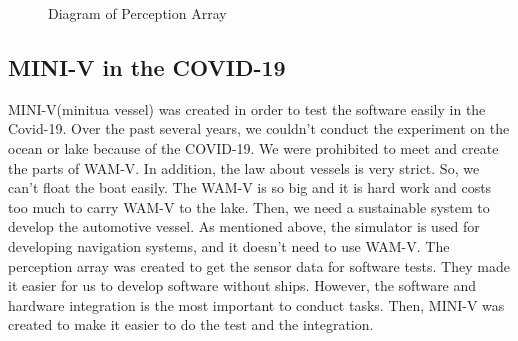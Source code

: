 \documentclass[lettersize,journal]{IEEEtran}
\begin{document}
\begin{figure}[H]
  \begin{center}
  \end{center}
  \caption{Diagram of Perception Array}
  \label{fig:perception_aray_diagram}
\end{figure}


\subsection{MINI-V in the COVID-19}
MINI-V(minitua vessel) was created in order to test the software easily in the Covid-19. Over the past several years, 
we couldn't conduct the experiment on the ocean or lake because of the COVID-19.
We were prohibited to meet and create the parts of WAM-V.
In addition, the law about vessels is very strict.
So, we can't float the boat easily. The WAM-V is so big and it is hard work and costs too much to carry WAM-V to the lake. 
Then, we need a sustainable system to develop the automotive vessel.
As mentioned above, the simulator is used for developing navigation systems, and it doesn't need to use WAM-V.
The perception array was created to get the sensor data for software tests. They made it easier for us to develop software without ships.
However, the software and hardware integration is the most important to conduct tasks. Then, MINI-V was created 
to make it easier to do the test and the integration.
\end{document}
